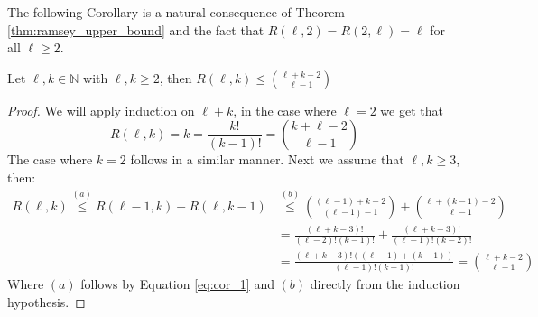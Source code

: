 The following Corollary is a natural consequence of Theorem \ref{thm:ramsey_upper_bound} and the fact that $R(\ell, 2) = R(2, \ell) = \ell$ for all $\ell \geq 2$.
\begin{corollary}
	Let $\ell, k \in \mathbb{N}$ with $\ell, k \geq 2$, then $R(\ell, k) \leq \binom{\ell + k - 2}{\ell - 1}$
\end{corollary}
\begin{proof}
	We will apply induction on $\ell + k$, in the case where $\ell = 2$ we get that
	\begin{equation*}
		R(\ell, k) = k = \frac{k!}{(k - 1)!} = \binom{k + \ell - 2}{\ell - 1}
	\end{equation*}
	The case where $k = 2$ follows in a similar manner. Next we assume that $\ell, k \geq 3$, then:
	\begin{align*}
		R(\ell, k) \stackrel{(a)}{\leq} R(\ell - 1, k) + R(\ell, k - 1) & \stackrel{(b)}{\leq} \binom{(\ell - 1) + k - 2}{(\ell - 1) - 1} + \binom{\ell + (k - 1) - 2}{\ell - 1} \\
		                                                                & =  \frac{(\ell + k - 3)!}{(\ell - 2)!(k - 1)!} + \frac{(\ell + k - 3)!}{(\ell - 1)!(k - 2)!}           \\
		                                                                & =  \frac{(\ell + k - 3)!((\ell - 1) + (k - 1))}{(\ell - 1)!(k - 1)!}
		= \binom{\ell + k - 2}{\ell - 1}
	\end{align*}
	Where $(a)$ follows by Equation \eqref{eq:cor_1} and $(b)$ directly from the induction hypothesis.
\end{proof}

